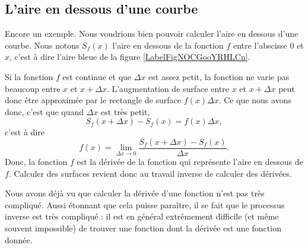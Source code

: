 \newcommand{\CaptionFigLesSubFigures}{Recherche de la tangente par approximations successives.}


\subsection{L'aire en dessous d'une courbe}		\label{SubSecAirePrimInto}

Encore un exemple. Nous voudrions bien pouvoir calculer l'aire en dessous d'une courbe. Nous notons $S_f(x)$ l'aire en dessous de la fonction $f$ entre l'abscisse $0$ et $x$, c'est à dire l'aire bleue de la figure \ref{LabelFigNOCGooYRHLCn}. %
\newcommand{\CaptionFigNOCGooYRHLCn}{L'aire en dessous d'une courbe. Le rectangle rouge d'aire $f(x)\Delta x$ approxime l'augmentation de l'aire lorsqu'on passe de $x$ à $x+\Delta x$.}


Si la fonction $f$ est continue et que $\Delta x$ est assez petit, la fonction ne varie pas beaucoup entre $x$ et $x+\Delta x$. L'augmentation de surface entre $x$ et $x+\Delta x$ peut donc être approximée par le rectangle de surface $f(x)\Delta x$. Ce que nous avons donc, c'est que quand $\Delta x$ est très petit,
\begin{equation}
	S_f(x+\Delta x)-S_f(x)=f(x)\Delta x,
\end{equation}
c'est à dire
\begin{equation}
	f(x)=\lim_{\Delta x\to 0}\frac{  S_f(x+\Delta x)-S_f(x)}{ \Delta x }.
\end{equation}
Donc, la fonction $f$ est la dérivée de la fonction qui représente l'aire en dessous de $f$. Calculer des surfaces revient donc au travail inverse de calculer des dérivées.

Nous avons déjà vu que calculer la dérivée d'une fonction n'est pas très compliqué. Aussi étonnant que cela puisse paraître, il se fait que le processus inverse est très compliqué : il est en général extrêmement difficile (et même souvent impossible) de trouver une fonction dont la dérivée est une fonction donnée.

